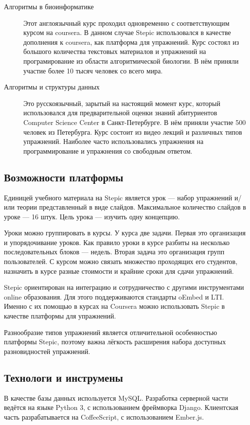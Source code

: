 \documentclass{matmex-diploma-custom}
\begin{document}
\begin{description}
\item[Алгоритмы в биоинформатике] Этот англоязычный курс проходил
  одновременно с соответствующим курсом на coursera. В данном случае
  Stepic использовался в качестве дополнения к coursera, как платформа
  для упражнений. Курс состоял из большого количества текстовых
  материалов и упражнений на програмирование из области
  алгоритмической биологии. В нём приняли участие более 10 тысяч
  человек со всего мира.

\item[Алгоритмы и структуры данных] Это русскоязычный, зарытый на
  настоящий момент курс, который использовался для предварительной
  оценки знаний абитуриентов Computer Science Center в
  Санкт-Петербурге. В нём приняли участие 500 человек из
  Петербурга. Курс состоит из видео лекций и различных типов
  упражнений. Наиболее часто использовались упражнения на
  программирование и упражнения со свободным ответом.
\end{description}

\subsection{Возможности платформы}
Единицей учебного материала на Stepic является урок --- набор упражнений
и/или теории представленный в виде слайдов. Максимальное количество
слайдов в уроке --- 16 штук. Цель урока --- изучить одну концепцию.

Уроки можно группировать в курсы. У курса две задачи. Первая это
организация и упорядочивание уроков. Как правило уроки в курсе разбиты
на несколько последовательных блоков --- недель. Вторая задача это
организация групп пользователей. С курсом можно связать множество
проходящих его студентов, назначить в курсе разные стоимости и крайние
сроки для сдачи упражнений.

Stepic ориентирован на интеграцию и сотрудничество с другими инструментами
online образования. Для этого поддерживаются стандарты oEmbed и
LTI. Именно с их помощью в курсах на Coursera можно использовать
Stepic в качестве платформы для упражнений.

Разнообразие типов упражнений является отличительной особенностью
платформы Stepic, поэтому важна лёгкость расширения набора доступных
разновидностей упражнений.

\subsection{Технологи и инструмены}
В качестве базы данных используется MySQL. Разработка серверной части
ведётся на языке Python 3, с использованием фреймворка
Django. Клиентская часть разрабатывается на CoffeeScript, с
использованием Ember.js.
\end{document}

